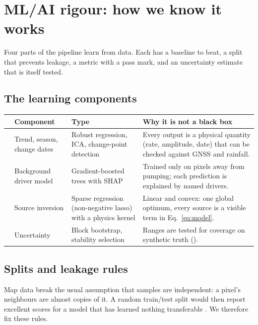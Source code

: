 \section{ML/AI rigour: how we know it works}\label{sec:rigour}

\begin{inshort}
Four parts of the pipeline learn from data. Each has a baseline to beat, a split that prevents
leakage, a metric with a pass mark, and an uncertainty estimate that is itself tested.
\end{inshort}

\subsection{The learning components}

{\small
\begin{xltabular}{\linewidth}{@{}L{8mm}L{33mm}L{30mm}Y@{}}
\toprule
 & \textbf{Component} & \textbf{Type} & \textbf{Why it is not a black box}\\*
\midrule
{} & Trend, season, change dates & Robust regression, ICA, change-point detection & Every output
  is a physical quantity (rate, amplitude, date) that can be checked against GNSS and rainfall.\\
 & Background driver model & Gradient-boosted trees with SHAP & Trained only on pixels away from
  pumping; each prediction is explained by named drivers.\\
 & Source inversion & Sparse regression (non-negative lasso) with a physics kernel & Linear and
  convex: one global optimum, every source is a visible term in Eq.~\eqref{eq:model}.\\
 & Uncertainty & Block bootstrap, stability selection & Ranges are tested for coverage on
  synthetic truth ().\\
\bottomrule
\end{xltabular}}

\subsection{Splits and leakage rules}

Map data break the usual assumption that samples are independent: a pixel's neighbours are almost
copies of it. A random train/test split would then report excellent scores for a model that has
learned nothing transferable \cite{roberts2017}. We therefore fix these rules.

